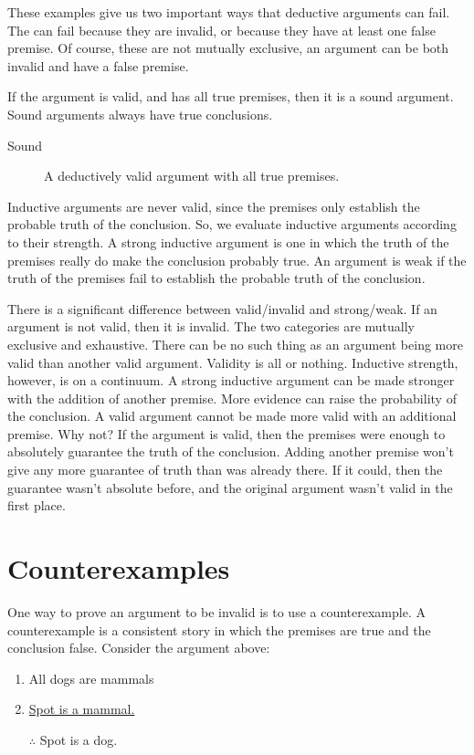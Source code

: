 These examples give us two important ways that deductive arguments can fail. The can fail because they are invalid, or because they have at least one false premise. Of course, these are not mutually exclusive, an argument can be both invalid and have a false premise.

If the argument is valid, and has all true premises, then it is a sound argument. Sound arguments always have true conclusions.


\begin{description}
\item[Sound] A deductively valid argument with all true premises.
\end{description}

Inductive arguments are never valid, since the premises only establish the probable truth of the conclusion. So, we evaluate inductive arguments according to their strength. A strong inductive argument is one in which the truth of the premises really do make the conclusion probably true. An argument is weak if the truth of the premises fail to establish the probable truth of the conclusion.

There is a significant difference between valid/invalid and strong/weak. If an argument is not valid, then it is invalid. The two categories are mutually exclusive and exhaustive. There can be no such thing as an argument being more valid than another valid argument. Validity is all or nothing. Inductive strength, however, is on a continuum. A strong inductive argument can be made stronger with the addition of another premise. More evidence can raise the probability of the conclusion. A valid argument cannot be made more valid with an additional premise. Why not? If the argument is valid, then the premises were enough to absolutely guarantee the truth of the conclusion. Adding another premise won't give any more guarantee of truth than was already there. If it could, then the guarantee wasn't absolute before, and the original argument wasn't valid in the first place.

\section{Counterexamples}
\label{sec:counterexamples}

One way to prove an argument to be invalid is to use a counterexample. A counterexample is a consistent story in which the premises are true and the conclusion false. Consider the argument above:

\begin{enumerate}
\item All dogs are mammals
\item \underline{Spot is a mammal.}
\item [$\therefore$] Spot is a dog.
\end{enumerate}

